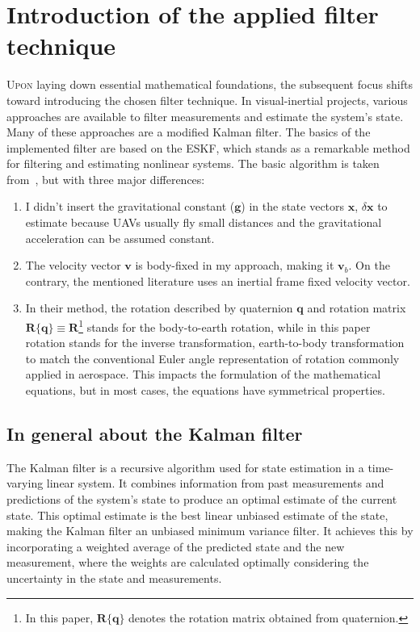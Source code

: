 \chapter{Introduction of the applied filter technique}\label{chap:eskf}

\lettrine{U}{pon} laying down essential mathematical foundations, the subsequent focus shifts toward introducing the chosen filter technique. In visual-inertial projects, various approaches are available to filter measurements and estimate the system's state. Many of these approaches are a modified Kalman filter. The basics of the implemented filter are based on the ESKF, which stands as a remarkable method for filtering and estimating nonlinear systems. The basic algorithm is taken from~\cite{quaternion-eskf}, but with three major differences:
\begin{enumerate}
    \item 
    I didn't insert the gravitational constant ($\mathbf{g}$)  in the state vectors $\mathbf{x}$, $\delta\mathbf{x}$ to estimate because UAVs usually fly small distances and the gravitational acceleration can be assumed constant.
    
    \item
    The velocity vector $\mathbf{v}$ is body-fixed in my approach, making it $\mathbf{v}_b$. On the contrary, the mentioned literature uses an inertial frame fixed velocity vector.
    
    \item 
    In their method, the rotation described by quaternion $\mathbf{q}$ and rotation matrix $\mathbf{R}\{\mathbf{q}\}\equiv\mathbf{R}$\footnote{In this paper, $\mathbf{R}\{\mathbf{q}\}$ denotes the rotation matrix obtained from quaternion.} stands for the body-to-earth rotation, while in this paper rotation stands for the inverse transformation, earth-to-body transformation to match the conventional Euler angle representation of rotation commonly applied in aerospace. This impacts the formulation of the mathematical equations, but in most cases, the equations have symmetrical properties.
\end{enumerate}

\section{In general about the Kalman filter}

The Kalman filter is a recursive algorithm used for state estimation in a time-varying linear system. It combines information from past measurements and predictions of the system's state to produce an optimal estimate of the current state. This optimal estimate is the best linear unbiased estimate of the state, making the Kalman filter an unbiased minimum variance filter. It achieves this by incorporating a weighted average of the predicted state and the new measurement, where the weights are calculated optimally considering the uncertainty in the state and measurements.

